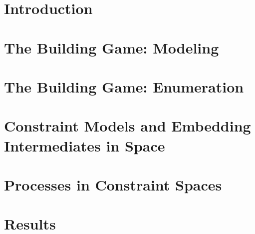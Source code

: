 \documentclass[12pt]{report}   %
\begin{document}
\chapter{Introduction}

\clearpage{\pagestyle{empty}\cleardoublepage}

\chapter{The Building Game: Modeling}

\clearpage{\pagestyle{empty}\cleardoublepage}

\chapter{The Building Game: Enumeration}

\clearpage{\pagestyle{empty}\cleardoublepage}

\chapter{Constraint Models and Embedding Intermediates in Space}

\clearpage{\pagestyle{empty}\cleardoublepage}

\chapter{Processes in Constraint Spaces}

\clearpage{\pagestyle{empty}\cleardoublepage}

\chapter{Results}

\clearpage{\pagestyle{empty}\cleardoublepage}

%
%
%



  
\end{document}
